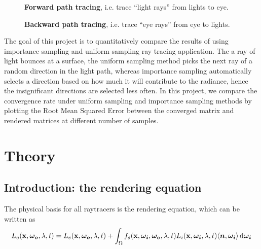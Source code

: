 \documentclass[12pt]{article}
\DeclarePairedDelimiter\ip{\langle }{\rangle}
\begin{document}
 \begin{figure}[H]
      \centering
      \caption{\textbf{Forward path tracing}, i.e. trace ``light rays'' from lights to eye.}
    \end{figure}
    
    \begin{figure}[H]
      \centering
      \caption{\textbf{Backward path tracing}, i.e. trace ``eye rays'' from eye to lights.}
    \end{figure}

\noindent The goal of this project is to quantitatively compare the results of using importance sampling and uniform sampling ray tracing application. The a ray of light bounces at a surface, the uniform sampling method picks the next ray of a random direction in the light path, whereas importance sampling automatically selects a direction based on how much it will contribute to the radiance, hence the insignificant directions are selected less often. In this project, we compare the convergence rate under uniform sampling and importance sampling methods by plotting the Root Mean Squared Error between the converged matrix and rendered matrices at different number of samples.
\newline
    
\section{Theory}
\subsection{Introduction: the rendering equation}
The physical basis for all raytracers is the rendering equation, which can be written as \autocite{kajiya1986rendering}
\[L_{o}(\mathbf x, \bm {\omega_{o}}, \lambda, t) = L_{e}(\mathbf x, \bm{\omega_o}, \lambda, t) + \int_\Omega f_s(\mathbf x, \bm{\omega_i}, \bm{\omega_o}, \lambda, t)L_i(\mathbf x, \bm{\omega_i}, \lambda, t)\ip{\bm n, \bm{\omega_i}} \dif \bm{\omega_i}\]
\end{document}
